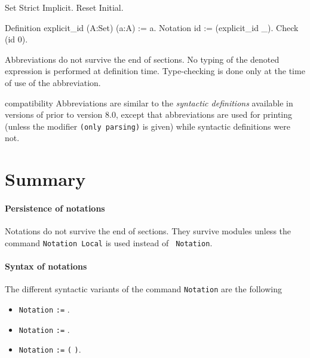 \Example

\begin{coq_eval}
Set Strict Implicit.
Reset Initial.
\end{coq_eval}
\begin{coq_example}
Definition explicit_id (A:Set) (a:A) := a.
Notation id := (explicit_id _).
Check (id 0).
\end{coq_example}

Abbreviations do not survive the end of sections. No typing of the denoted
expression is performed at definition time. Type-checking is done only
at the time of use of the abbreviation.

\Rem {} %
compatibility Abbreviations are similar to the {\em syntactic
definitions} available in versions of {\Coq} prior to version 8.0,
except that abbreviations are used for printing (unless the modifier
\verb=(only parsing)= is given) while syntactic definitions were not.

\section{Summary}

\paragraph{Persistence of notations}

Notations do not survive the end of sections. They survive modules
unless the command {\tt Notation Local} is used instead of {\tt
Notation}.

\paragraph{Syntax of notations}

The different syntactic variants of the command \texttt{Notation} are
the following

\begin{itemize}

\item \texttt{Notation} {\str} \texttt{:=} {\term}.

\item \texttt{Notation} {\ident} \texttt{:=} {\term}.

\item \texttt{Notation} {\str} \texttt{:=} {\term} {\tt (}  {\tt )}.

\end{itemize}

